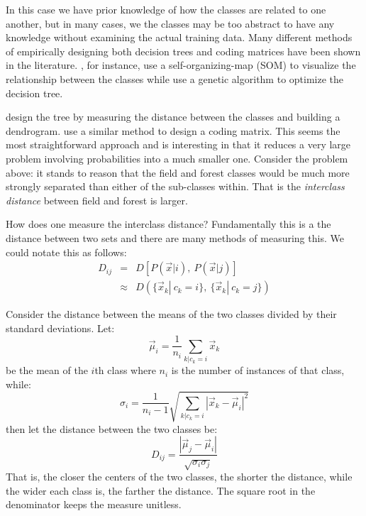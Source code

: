 \documentclass{article}
\begin{document}
In this case we have prior knowledge of how the classes are related to one another,
but in many cases, we the classes may be too abstract to have any knowledge without examining the actual training data.
Many different methods of empirically designing both decision trees and coding matrices have been shown in the literature.
\citet{Cheong_etal2004}, for instance, use a self-organizing-map (SOM)
\cite{Kohonen2000} to visualize the relationship between the classes while
\citet{Lee_Oh2003} use a genetic algorithm to optimize the decision tree.

\citet{Benabdeslem_Bennani2006} design the tree by measuring the distance between
the classes and building a dendrogram.
\citet{Zhou_etal2008} use a similar method to design a coding matrix.
This seems the most straightforward approach and is interesting in that it reduces a very large problem involving probabilities into a much smaller one.
Consider the problem above: it stands to reason that the field and forest classes would be much more strongly separated than either of the sub-classes within.
That is the {\it interclass distance} between field and forest is larger.

How does one measure the interclass distance? Fundamentally this is a the distance between two sets and there are many methods of measuring this.
We could notate this as follows:
\begin{eqnarray}
	D_{ij} & = & D\left [P(\vec x|i),~P(\vec x|j)\right ] \\
	       & \approx & D\left (\lbrace \vec x_k|~c_k=i \rbrace,~\lbrace \vec x_k|~c_k=j\rbrace \right )
\end{eqnarray}

Consider the distance between the means of the two classes divided by their standard deviations. Let:
\begin{equation}
	\vec \mu_i = \frac{1}{n_i} \sum_{k|c_k=i} \vec x_k
\end{equation}
be the mean of the $i$th class where $n_i$ is the number of instances of that class, while:
\begin{equation}
	\sigma_i = \frac{1}{n_i-1}\sqrt{\sum_{k|c_k=i}|\vec x_k - \vec \mu_i|^2}
\end{equation}
then let the distance between the two classes be:
\begin{equation}
	D_{ij}=\frac{|\vec \mu_j - \vec \mu_i |}{\sqrt{\sigma_i \sigma_j}}
\end{equation}
That is, the closer the centers of the two classes, the shorter the distance, while the wider each class is, the farther the distance.
The square root in the denominator keeps the measure unitless.
	
\end{document}
